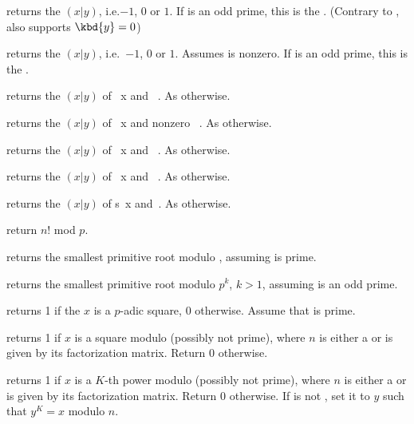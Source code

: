  returns the  $(x|y)$,
i.e.$-1$, $0$ or $1$. If  is an odd prime, this is the . (Contrary to ,  also supports $\kbd{y} = 0$)

 returns the 
$(x|y)$, i.e.~$-1$, $0$ or $1$. Assumes  is nonzero. If  is an
odd prime, this is the .

 returns the  $(x|y)$
of ~x and ~. As  otherwise.

 returns the  $(x|y)$
of ~x and nonzero ~. As  otherwise.

 returns the  $(x|y)$
of ~x and ~. As  otherwise.

 returns the  $(x|y)$
of ~x and ~. As  otherwise.

 returns the  $(x|y)$
of s~x and~. As  otherwise.

 return $n!$ mod $p$.

 returns the smallest primitive root modulo
, assuming  is prime.

 returns the smallest primitive root modulo $p^k$,
$k > 1$, assuming  is an odd prime.

 returns 1 if the  $x$ is
a $p$-adic square, $0$ otherwise. Assume that  is prime.

 returns 1 if  $x$ is
a square modulo  (possibly not prime), where $n$ is either a 
or is given by its factorization matrix. Return $0$ otherwise.

 returns 1 if 
$x$ is a $K$-th power modulo  (possibly not prime), where $n$ is
either a  or is given by its factorization matrix. Return $0$
otherwise. If  is not , set it to $y$ such that $y^K = x$
modulo $n$.

